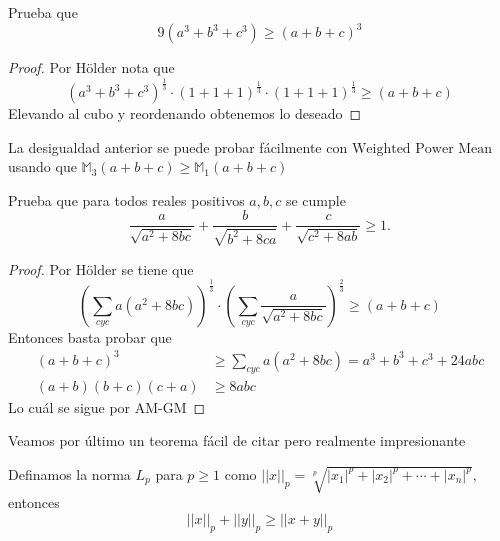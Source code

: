 \documentclass[11pt]{scrartcl}
\begin{document}
\begin{example}
    Prueba que \[9(a^3+b^{3}+c^{3})\geq (a+b+c)^3\]
\end{example}\begin{proof}
Por $\hyperref[Holder]{\text{Hölder}}$ nota que 
\[\left(a^3+b^3+c^3\right)^{\frac{1}{3}}\cdot \left(1+1+1\right)^{\frac{1}{3}}\cdot\left(1+1+1\right)^{\frac{1}{3}}\geq (a+b+c)\]
Elevando al cubo y reordenando obtenemos lo deseado
    
\end{proof}
\begin{remark*}
    La desigualdad anterior se puede probar fácilmente con $\hyperref[Weighted Power Mean Inequality]{\text{Weighted Power Mean}}$ usando que $\mathbb{M}_{3}\left(a+b+c\right)\geq\mathbb{M}_{1}\left(a+b+c\right)$
\end{remark*}

\begin{example}
    Prueba que para todos reales positivos $a,b,c$ se cumple \[ \frac{a}{\sqrt{a^2 + 8bc}} + \frac{b}{\sqrt{b^2 + 8ca}} + \frac{c}{\sqrt{c^2 + 8ab}} \geq 1.  \]
\end{example}
\begin{proof}
Por $\hyperref[Holder]{\text{Hölder}}$ se tiene que
\[\left(\sum_{cyc} a(a^2+8bc)\right)^{\frac{1}{3}}\cdot \left(\sum_{cyc} \frac{a}{\sqrt{a^2+8bc}}\right)^{\frac{2}{3}}\geq(a+b+c)\]
Entonces basta probar que 
\begin{align*}
    (a+b+c)^3&\geq \sum_{cyc} a(a^2+8bc)=a^3+b^3+c^3+24abc \\ (a+b)(b+c)(c+a) &\geq 8abc
\end{align*}
Lo cuál se sigue por $\hyperref[Desigualdad de medias]{\text{AM-GM}}$
\end{proof}

Veamos por último un teorema fácil de citar pero realmente impresionante
\begin{theorem}
    \label{Minkowski}
    Definamos la norma $L_p$ para $p\geq 1$ como $||x||_p=\sqrt[p]{|x_1|^p+|x_2|^p+\cdots+|x_n|^p}$, entonces 
    \[||x||_p+||y||_p\geq ||x+y||_p\]
\end{theorem}
\end{document}
